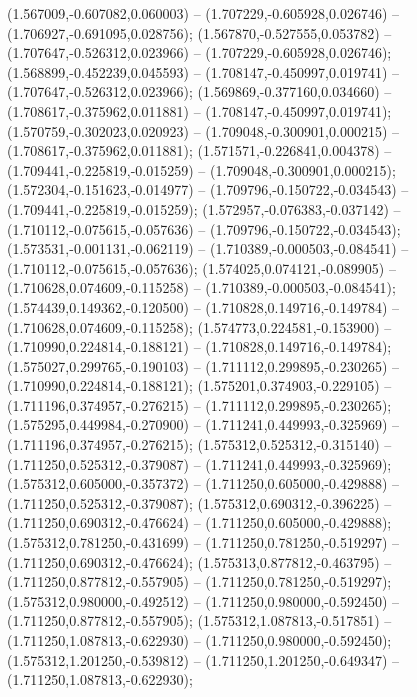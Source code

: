  (1.567009,-0.607082,0.060003) -- (1.707229,-0.605928,0.026746) -- (1.706927,-0.691095,0.028756);
 (1.567870,-0.527555,0.053782) -- (1.707647,-0.526312,0.023966) -- (1.707229,-0.605928,0.026746);
 (1.568899,-0.452239,0.045593) -- (1.708147,-0.450997,0.019741) -- (1.707647,-0.526312,0.023966);
 (1.569869,-0.377160,0.034660) -- (1.708617,-0.375962,0.011881) -- (1.708147,-0.450997,0.019741);
 (1.570759,-0.302023,0.020923) -- (1.709048,-0.300901,0.000215) -- (1.708617,-0.375962,0.011881);
 (1.571571,-0.226841,0.004378) -- (1.709441,-0.225819,-0.015259) -- (1.709048,-0.300901,0.000215);
 (1.572304,-0.151623,-0.014977) -- (1.709796,-0.150722,-0.034543) -- (1.709441,-0.225819,-0.015259);
 (1.572957,-0.076383,-0.037142) -- (1.710112,-0.075615,-0.057636) -- (1.709796,-0.150722,-0.034543);
 (1.573531,-0.001131,-0.062119) -- (1.710389,-0.000503,-0.084541) -- (1.710112,-0.075615,-0.057636);
 (1.574025,0.074121,-0.089905) -- (1.710628,0.074609,-0.115258) -- (1.710389,-0.000503,-0.084541);
 (1.574439,0.149362,-0.120500) -- (1.710828,0.149716,-0.149784) -- (1.710628,0.074609,-0.115258);
 (1.574773,0.224581,-0.153900) -- (1.710990,0.224814,-0.188121) -- (1.710828,0.149716,-0.149784);
 (1.575027,0.299765,-0.190103) -- (1.711112,0.299895,-0.230265) -- (1.710990,0.224814,-0.188121);
 (1.575201,0.374903,-0.229105) -- (1.711196,0.374957,-0.276215) -- (1.711112,0.299895,-0.230265);
 (1.575295,0.449984,-0.270900) -- (1.711241,0.449993,-0.325969) -- (1.711196,0.374957,-0.276215);
 (1.575312,0.525312,-0.315140) -- (1.711250,0.525312,-0.379087) -- (1.711241,0.449993,-0.325969);
 (1.575312,0.605000,-0.357372) -- (1.711250,0.605000,-0.429888) -- (1.711250,0.525312,-0.379087);
 (1.575312,0.690312,-0.396225) -- (1.711250,0.690312,-0.476624) -- (1.711250,0.605000,-0.429888);
 (1.575312,0.781250,-0.431699) -- (1.711250,0.781250,-0.519297) -- (1.711250,0.690312,-0.476624);
 (1.575313,0.877812,-0.463795) -- (1.711250,0.877812,-0.557905) -- (1.711250,0.781250,-0.519297);
 (1.575312,0.980000,-0.492512) -- (1.711250,0.980000,-0.592450) -- (1.711250,0.877812,-0.557905);
 (1.575312,1.087813,-0.517851) -- (1.711250,1.087813,-0.622930) -- (1.711250,0.980000,-0.592450);
 (1.575312,1.201250,-0.539812) -- (1.711250,1.201250,-0.649347) -- (1.711250,1.087813,-0.622930);
